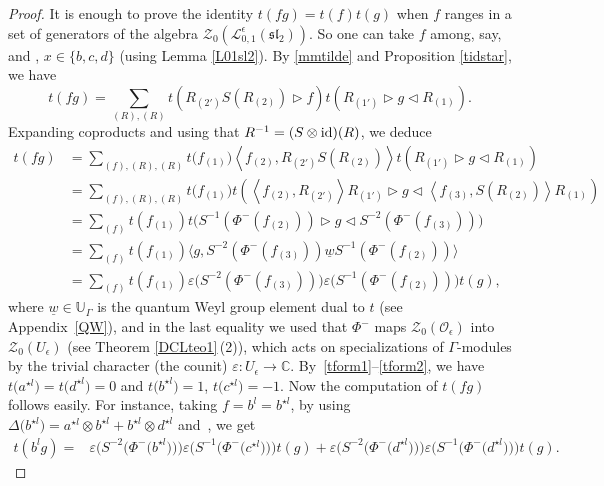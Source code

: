 \documentclass[10pt,a4paper]{amsart}
\numberwithin{equation}{section}
\theoremstyle{definition}
\newcommand{\e}{\epsilon}
\newcommand{\mc}{\mathbb{C}}
\newcommand{\Ll}{{\mathcal L}}
\newcommand{\Oo}{{\mathcal O}}
\newcommand{\ra}{\rightarrow}
\begin{document}
\begin{proof}
It is enough to prove the identity $t(fg) = t(f)t(g)$ when $f$ ranges in a set of generators of the algebra $\mathcal{Z}_0(\Ll_{0,1}^\e({\mathfrak{sl}_2}))$. So one can take $f$ among, say,  and , $x\in \{b,c,d\}$ (using Lemma \ref{L01sl2}). By \eqref{mmtilde} and Proposition \ref{tidstar}, we have
\[t(fg) = \sum_{(R),(R)} t\left(R_{(2')}{S}(R_{(2)}) \rhd f\right) t\left(R_{(1')}\rhd g \lhd R_{(1)}\right).\]
Expanding coproducts and using that $R^{-1} = (S\otimes {\rm id})(R)$, we deduce
\begin{align*}\label{tprod1}
 t(fg) & = \sum_{(f),(R),(R)} t\big(f_{(1)}\big) \left\langle f_{(2)} , R_{(2')}{S}(R_{(2)}) \right\rangle t\left(R_{(1')}\rhd g \lhd R_{(1)}\right)\\
 & = \sum_{(f),(R),(R)} t\big(f_{(1)}\big) t(\left\langle f_{(2)} , R_{(2')}\right\rangle R_{(1')}\rhd g \lhd \left\langle f_{(3)} ,S(R_{(2)}) \right\rangle R_{(1)})\\
 & = \sum_{(f)} t(f_{(1)}) t\big( S^{-1}(\Phi^-(f_{(2)}))\rhd g \lhd S^{-2}(\Phi^-(f_{(3)}))\big)\\
 & = \sum_{(f)} t(f_{(1)}) \big\langle g, S^{-2}(\Phi^-(f_{(3)}))\underline{w} S^{-1}(\Phi^-(f_{(2)})) \big\rangle\\
 & = \sum_{(f)} t(f_{(1)}) \varepsilon\big( S^{-2}(\Phi^-(f_{(3)})) \big) \varepsilon\big( S^{-1}(\Phi^-(f_{(2)})) \big) t(g),
\end{align*}
where $\underline{w}\in\mathbb{U}_\Gamma$ is the quantum Weyl group element dual to $t$ (see Appendix~\ref{QW}), and in the last equality we used that $\Phi^-$ maps $\mathcal{Z}_0(\Oo_\e)$ into $\mathcal{Z}_0(U_\e)$ (see Theorem \ref{DCLteo1}\,(2)), which acts on specializations of $\Gamma$-modules by the trivial character (the counit) $\varepsilon \colon U_\e \ra \mc$. \mbox{By~\eqref{tform1}--\eqref{tform2}}, we have $t\big(a^{\star l}\big)=t\big(d^{\star l}\big)=0$ and $t\big(b^{\star l}\big)=1$, $t\big(c^{\star l}\big)=-1$. Now the computation of $t(fg)$ follows easily. For instance, taking $f=b^l=b^{\star l}$, by using $\Delta\big(b^{\star l}\big) = a^{\star l}\otimes b^{\star l}+b^{\star l}\otimes d^{\star l}$ and~, we get
\begin{align*}
 t(b^lg) ={}& \varepsilon\big( S^{-2}\big(\Phi^-\big(b^{\star l}\big)\big) \big) \varepsilon\big( S^{-1}\big(\Phi^-\big(c^{\star l}\big)\big) \big) t(g) + \varepsilon\big( S^{-2}\big(\Phi^-\big(d^{\star l}\big)\big) \big) \varepsilon\big( S^{-1}\big(\Phi^-\big(d^{\star l}\big)\big) \big) t(g).

\end{align*}
\end{proof}
\end{document}
